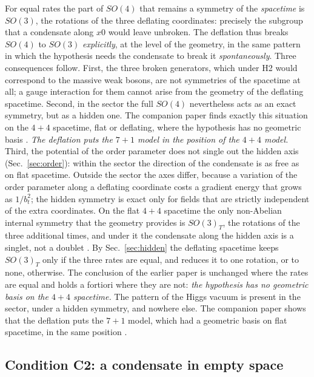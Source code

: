 For equal rates the part of $SO(4)$ that remains a symmetry of the \emph{spacetime} is $SO(3)$, the
rotations of the three deflating coordinates: precisely the subgroup that a condensate along $x0$
would leave unbroken.
The deflation thus breaks $SO(4)$ to $SO(3)$ \emph{explicitly}, at the level of the geometry, in
the same pattern in which the hypothesis needs the condensate to break it \emph{spontaneously}.
Three consequences follow. First, the three broken generators, which under H2 would correspond to
the massive weak bosons, are not symmetries of the spacetime at all; a gauge interaction for them
cannot arise from the geometry of the deflating spacetime. Second, in the sector the full $SO(4)$
nevertheless acts as an exact symmetry, but as a hidden one. The companion paper finds exactly this
situation on the $4+4$ spacetime, flat or deflating, where the hypothesis has no geometric basis
\cite{CompanionDefl1644}. \emph{The deflation puts the $7+1$ model in the position of the $4+4$
model.} Third, the potential of the order parameter does not single out the hidden axis
(Sec.~\ref{sec:order}): within the sector the direction of the condensate is as free as on flat
spacetime. Outside the sector the axes differ, because a variation of the order parameter along a
deflating coordinate costs a gradient energy that grows as $1/b_t^{2}$; the hidden symmetry is exact
only for fields that are strictly independent of the extra coordinates.
On the flat $4+4$ spacetime the only non-Abelian internal symmetry that the geometry provides is
$SO(3)_T$, the rotations of the three additional times, and under it the condensate along the hidden
axis is a singlet, not a doublet \cite{Flat1644}. By Sec.~\ref{sec:hidden} the deflating spacetime
keeps $SO(3)_T$ only if the three rates are equal, and reduces it to one rotation, or to none,
otherwise. The conclusion of the earlier paper is unchanged where the rates are equal and holds a
fortiori where they are not: \emph{the hypothesis has no geometric basis on the $4+4$ spacetime.}
The pattern of the Higgs vacuum is present in the sector, under a hidden symmetry, and nowhere else.
The companion paper shows that the deflation puts the $7+1$ model, which had a geometric basis on
flat spacetime, in the same position \cite{CompanionDefl1671}.

\subsection{Condition C2: a condensate in empty space}

